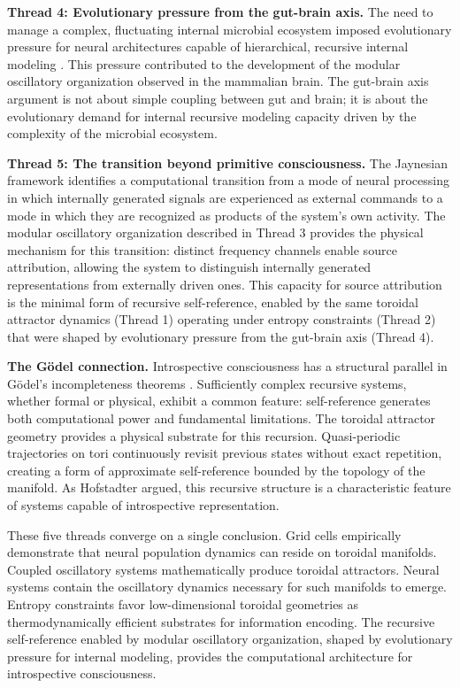 \documentclass[12pt,a4paper]{article}
\begin{document}
\textbf{Thread 4: Evolutionary pressure from the gut-brain axis.}
The need to manage a complex, fluctuating internal microbial ecosystem imposed evolutionary pressure for neural architectures capable of hierarchical, recursive internal modeling \cite{Cryan2019}.
This pressure contributed to the development of the modular oscillatory organization observed in the mammalian brain.
The gut-brain axis argument is not about simple coupling between gut and brain; it is about the evolutionary demand for internal recursive modeling capacity driven by the complexity of the microbial ecosystem.

\textbf{Thread 5: The transition beyond primitive consciousness.}
The Jaynesian framework \cite{Jaynes1976} identifies a computational transition from a mode of neural processing in which internally generated signals are experienced as external commands to a mode in which they are recognized as products of the system's own activity.
The modular oscillatory organization described in Thread 3 provides the physical mechanism for this transition: distinct frequency channels enable source attribution, allowing the system to distinguish internally generated representations from externally driven ones.
This capacity for source attribution is the minimal form of recursive self-reference, enabled by the same toroidal attractor dynamics (Thread 1) operating under entropy constraints (Thread 2) that were shaped by evolutionary pressure from the gut-brain axis (Thread 4).

\textbf{The G\"odel connection.}
Introspective consciousness has a structural parallel in G\"odel's incompleteness theorems \cite{Godel1931}.
Sufficiently complex recursive systems, whether formal or physical, exhibit a common feature: self-reference generates both computational power and fundamental limitations.
The toroidal attractor geometry provides a physical substrate for this recursion. Quasi-periodic trajectories on tori continuously revisit previous states without exact repetition, creating a form of approximate self-reference bounded by the topology of the manifold.
As Hofstadter \cite{Hofstadter1979} argued, this recursive structure is a characteristic feature of systems capable of introspective representation.

These five threads converge on a single conclusion.
Grid cells empirically demonstrate that neural population dynamics can reside on toroidal manifolds.
Coupled oscillatory systems mathematically produce toroidal attractors.
Neural systems contain the oscillatory dynamics necessary for such manifolds to emerge.
Entropy constraints favor low-dimensional toroidal geometries as thermodynamically efficient substrates for information encoding.
The recursive self-reference enabled by modular oscillatory organization, shaped by evolutionary pressure for internal modeling, provides the computational architecture for introspective consciousness.
\end{document}
